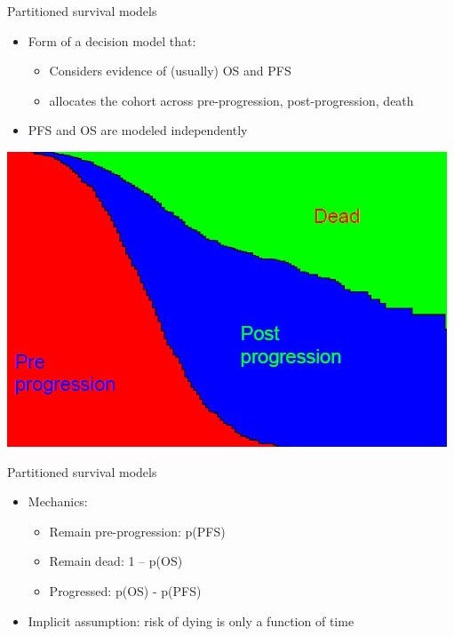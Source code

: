 \documentclass[
  ignorenonframetext,
]{beamer}
\providecommand{\tightlist}{%
  \setlength{\itemsep}{0pt}\setlength{\parskip}{0pt}}
\begin{document}
\begin{frame}{Partitioned survival models}
\protect\hypertarget{partitioned-survival-models}{}

\begin{itemize}
\tightlist
\item
  Form of a decision model that:

  \begin{itemize}
  \tightlist
  \item
    Considers evidence of (usually) OS and PFS
  \item
    allocates the cohort across pre-progression, post-progression, death
  \end{itemize}
\item
  PFS and OS are modeled independently
\end{itemize}

\end{frame}

\begin{frame}

\includegraphics[width=1\linewidth]{figures/psm}

\end{frame}

\begin{frame}{Partitioned survival models}
\protect\hypertarget{partitioned-survival-models-1}{}

\begin{itemize}
\tightlist
\item
  Mechanics:

  \begin{itemize}
  \tightlist
  \item
    Remain pre-progression: p(PFS)
  \item
    Remain dead: 1 -- p(OS)
  \item
    Progressed: p(OS) - p(PFS)
  \end{itemize}
\item
  Implicit assumption: risk of dying is only a function of time
\end{itemize}

\end{frame}
\end{document}
